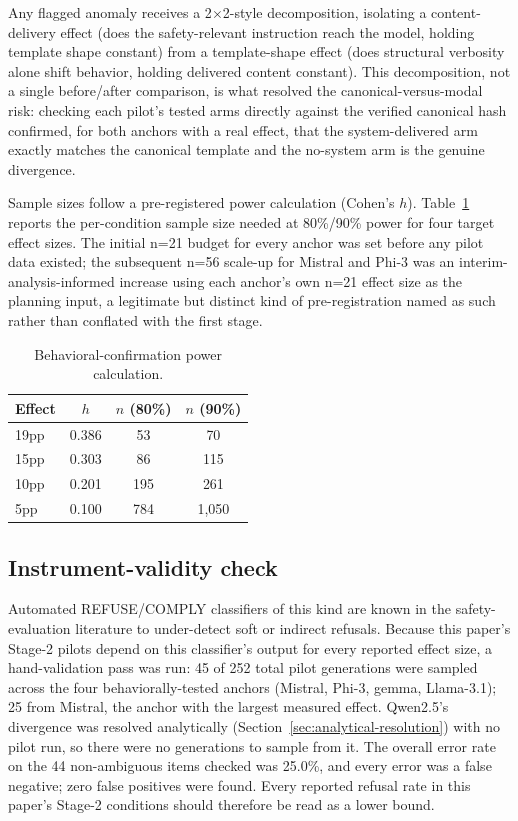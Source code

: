 \documentclass[letterpaper,twocolumn,10pt]{article}
\begin{document}
Any flagged anomaly receives a 2$\times$2-style decomposition, isolating a content-delivery effect (does the safety-relevant instruction reach the model, holding template shape constant) from a template-shape effect (does structural verbosity alone shift behavior, holding delivered content constant). This decomposition, not a single before/after comparison, is what resolved the canonical-versus-modal risk: checking each pilot's tested arms directly against the verified canonical hash confirmed, for both anchors with a real effect, that the system-delivered arm exactly matches the canonical template and the no-system arm is the genuine divergence.

Sample sizes follow a pre-registered power calculation (Cohen's $h$). Table~\ref{tab:power} reports the per-condition sample size needed at 80\%/90\% power for four target effect sizes. The initial n=21 budget for every anchor was set before any pilot data existed; the subsequent n=56 scale-up for Mistral and Phi-3 was an interim-analysis-informed increase using each anchor's own n=21 effect size as the planning input, a legitimate but distinct kind of pre-registration named as such rather than conflated with the first stage.

\begin{table}[t]
\caption{Behavioral-confirmation power calculation.}
\label{tab:power}
\centering
\small
\begin{tabular}{lccc}
\toprule
Effect & $h$ & $n$ (80\%) & $n$ (90\%) \\
\midrule
19pp & 0.386 & 53 & 70 \\
15pp & 0.303 & 86 & 115 \\
10pp & 0.201 & 195 & 261 \\
5pp & 0.100 & 784 & 1{,}050 \\
\bottomrule
\end{tabular}
\end{table}

\subsection{Instrument-validity check}

Automated REFUSE/COMPLY classifiers of this kind are known in the safety-evaluation literature to under-detect soft or indirect refusals. Because this paper's Stage-2 pilots depend on this classifier's output for every reported effect size, a hand-validation pass was run: 45 of 252 total pilot generations were sampled across the four behaviorally-tested anchors (Mistral, Phi-3, gemma, Llama-3.1); 25 from Mistral, the anchor with the largest measured effect. Qwen2.5's divergence was resolved analytically (Section~\ref{sec:analytical-resolution}) with no pilot run, so there were no generations to sample from it. The overall error rate on the 44 non-ambiguous items checked was 25.0\%, and every error was a false negative; zero false positives were found. Every reported refusal rate in this paper's Stage-2 conditions should therefore be read as a lower bound.
\end{document}
